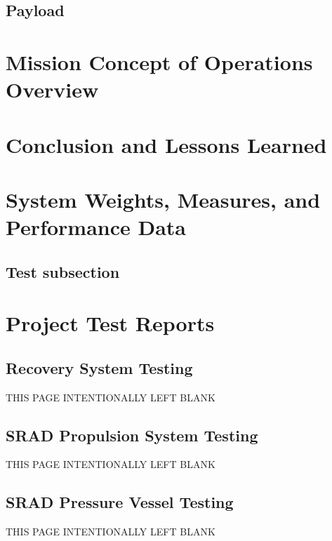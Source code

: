 \documentclass[report]{sac}
\newif\ifwip
\newcommand\putdescription[1]{
\ifwip
    \begingroup
    \small\em
    #1
    \endgroup
\fi}
\newcommand\pageleftblank{
\begin{center}
    \Large
    THIS PAGE INTENTIONALLY LEFT BLANK
\end{center}}
\begin{document}
	\subsection{Payload} \label{payload}
 
	\section{Mission Concept of Operations Overview} \label{conops}
 
	\putdescription{\CONOPSDescription}

	\section{Conclusion and Lessons Learned}
	\putdescription{\ConclusionDescription}

	\appendix
    \renewcommand{\thesubsection}{\thesection.\arabic{subsection}}
    \renewcommand{\thesubsubsection}{\thesubsection.\arabic{subsubsection}}

	\ifwip
        
	\fi

	\section{System Weights, Measures, and Performance Data}\label{measures}
	\putdescription{\SystemMeasuresDescription}
    \subsection{Test subsection}

	\pagebreak
	\section{Project Test Reports}\label{test-reports}
	\putdescription{\TestReportsDescription}

	\subsection{Recovery System Testing}\label{recovery-test}
    \pageleftblank

	\pagebreak
	\subsection{SRAD Propulsion System Testing}\label{propulsion-test}
	\pageleftblank

	\pagebreak
	\subsection{SRAD Pressure Vessel Testing}\label{pressure-test}
	\pageleftblank
\end{document}
